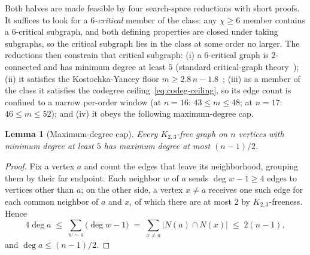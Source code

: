 \documentclass[11pt]{article}
\newtheorem{lemma}{Lemma}
\theoremstyle{definition}
\newcommand{\chrom}{\chi}
\begin{document}
Both halves are made feasible by four
search-space reductions with short proofs. It suffices to look for a
\emph{$6$-critical} member of the class: any $\chrom \ge 6$ member contains a
$6$-critical subgraph, and both defining properties are closed under taking
subgraphs, so the critical subgraph lies in the class at some order no larger.
The reductions then constrain that critical subgraph: (i) a $6$-critical graph
is $2$-connected and has minimum degree at least $5$ (standard critical-graph
theory~\cite{JensenToft1995}); (ii) it satisfies the Kostochka-Yancey floor
$m \ge 2.8\,n - 1.8$~\cite{KostochkaYancey2014}; (iii) as a member of the class
it satisfies the codegree ceiling~\eqref{eq:codeg-ceiling}, so its edge count
is confined to a narrow per-order window (at $n = 16$: $43 \le m \le 48$; at
$n = 17$: $46 \le m \le 52$); and
(iv) it obeys the following maximum-degree cap.

\begin{lemma}[Maximum-degree cap]
\label{lem:maxdeg}
Every $K_{2,3}$-free graph on $n$ vertices with minimum degree at least $5$ has
maximum degree at most $(n-1)/2$.
\end{lemma}

\begin{proof}
Fix a vertex $a$ and count the edges that leave its neighborhood, grouping them
by their far endpoint. Each neighbor $w$ of $a$ sends $\deg w - 1 \ge 4$ edges
to vertices other than $a$; on the other side, a vertex $x \ne a$ receives one
such edge for each common neighbor of $a$ and $x$, of which there are at most
$2$ by $K_{2,3}$-freeness. Hence
\[
  4 \deg a \;\le\; \sum_{w \sim a} \bigl(\deg w - 1\bigr)
  \;=\; \sum_{x \ne a} \bigl|N(a) \cap N(x)\bigr|
  \;\le\; 2(n-1),
\]
and $\deg a \le (n-1)/2$.
\end{proof}
\end{document}
